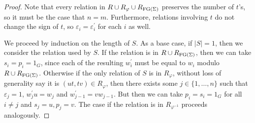 \begin{proof}
  Note that every relation in $R\cup R_\varphi \cup R_{\textrm{FG}(\Sigma)}$ preserves the number of
  $t$'s, so it must be the case that $n = m$. Furthermore, relations involving $t$ do not change
  the sign of $t$, so $\varepsilon_i = \varepsilon^\prime_i$ for each $i$ as well.

  We proceed by induction on the length of $S$. As a base case, if $|S| = 1$, then
  we consider the relation used by $S$.
  If the relation is in $R\cup R_{\textrm{FG}(\Sigma)}$, then
  we can take $s_i=p_i=1_G$, since each of the resulting $w_i^\prime$ must be equal to $w_i$
  modulo $R\cup R_{\textrm{FG}(\Sigma)}$.
  Otherwise if the only relation of $S$ is in $R_\varphi$, without loss of generality say it is
  $(ut, tv)\in R_\varphi$, then there exists some $j\in\{1,\ldots, n\}$ such that $\varepsilon_j
  = 1$, $w_j^\prime u = w_j$ and $w_{j-1}^\prime = vw_{j-1}$.
  But then we can take $p_i = s_i = 1_G$ for all $i\neq j$ and $s_j = u, p_j = v$.
  The case if the relation is in $R_{\varphi^{-1}}$ proceeds analogously.


\end{proof}
